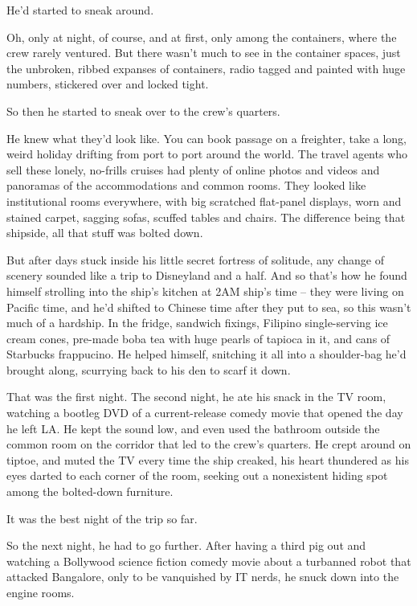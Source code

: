 He'd started to sneak around.

Oh, only at night, of course, and at first, only among the
containers, where the crew rarely ventured. But there wasn't much
to see in the container spaces, just the unbroken, ribbed expanses
of containers, radio tagged and painted with huge numbers,
stickered over and locked tight.

So then he started to sneak over to the crew's quarters.

He knew what they'd look like. You can book passage on a freighter,
take a long, weird holiday drifting from port to port around the
world. The travel agents who sell these lonely, no-frills cruises
had plenty of online photos and videos and panoramas of the
accommodations and common rooms. They looked like institutional
rooms everywhere, with big scratched flat-panel displays, worn and
stained carpet, sagging sofas, scuffed tables and chairs. The
difference being that shipside, all that stuff was bolted down.

But after days stuck inside his little secret fortress of solitude,
any change of scenery sounded like a trip to Disneyland and a half.
And so that's how he found himself strolling into the ship's
kitchen at 2AM ship's time -- they were living on Pacific time, and
he'd shifted to Chinese time after they put to sea, so this wasn't
much of a hardship. In the fridge, sandwich fixings, Filipino
single-serving ice cream cones, pre-made boba tea with huge pearls
of tapioca in it, and cans of Starbucks frappucino. He helped
himself, snitching it all into a shoulder-bag he'd brought along,
scurrying back to his den to scarf it down.

That was the first night. The second night, he ate his snack in the
TV room, watching a bootleg DVD of a current-release comedy movie
that opened the day he left LA. He kept the sound low, and even
used the bathroom outside the common room on the corridor that led
to the crew's quarters. He crept around on tiptoe, and muted the TV
every time the ship creaked, his heart thundered as his eyes darted
to each corner of the room, seeking out a nonexistent hiding spot
among the bolted-down furniture.

It was the best night of the trip so far.

So the next night, he had to go further. After having a third pig
out and watching a Bollywood science fiction comedy movie about a
turbanned robot that attacked Bangalore, only to be vanquished by
IT nerds, he snuck down into the engine rooms.

